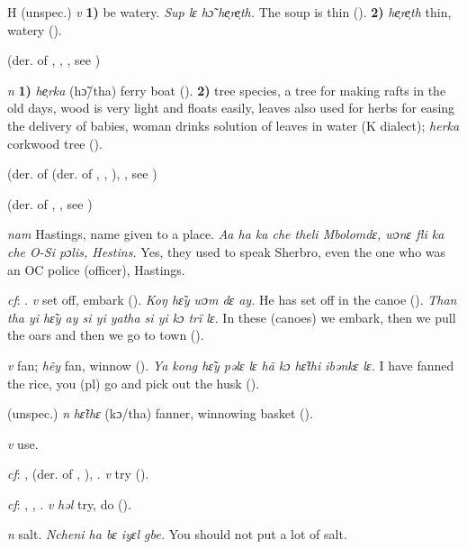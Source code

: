 \begin{letter}{H}
 (unspec.) \textit{v} \textbf{1)} be watery. \textit{Sup lɛ hɔ̃ he̹re̹th.} The soup is thin (\citealt{Pichl1967}). \textbf{2)} \textit{he̹re̹th} thin, watery (\citealt{Pichl1967}). 

 (der. of , , , see ) 

 \textit{n} \textbf{1)} \textit{he̹rka} (hɔ̃/tha) ferry boat (\citealt{Pichl1967}). \textbf{2)} tree species, a tree for making rafts in the old days, wood is very light and floats easily, leaves also used for herbs for easing the delivery of babies, woman drinks solution of leaves in water (K dialect); \textit{herka} corkwood tree (\citealt{Sumner1921}).

 (der. of  (der. of , , ), , see ) 

 (der. of , , see ) 

 \textit{nam} Hastings, name given to a place. \textit{Aa ha ka che theli Mbolomdɛ, wɔnɛ fli ka che O-Si pɔlis, Hestins.} Yes, they used to speak Sherbro, even the one who was an OC police (officer), Hastings.

 \textit{cf}: . \textit{v} set off, embark (\citealt{Sumner1921}). \textit{Koŋ hɛ̃y wɔm dɛ ay.} He has set off in the canoe (\citealt{Pichl1967}). \textit{Than tha yi hɛ̃y ay si yi yatha si yi kɔ trï lɛ.} In these (canoes) we embark, then we pull the oars and then we go to town (\citealt{Pichl1967}).

 \textit{v} fan; \textit{hẽy} fan, winnow (\citealt{Pichl1967}). \textit{Ya kong hɛ̃y pəlɛ lɛ hã kɔ hɛ̃thi ibənkɛ lɛ.} I have fanned the rice, you (pl) go and pick out the husk (\citealt{Pichl1967}).

 (unspec.) \textit{n} \textit{hɛ̃thɛ} (kɔ/tha) fanner, winnowing basket (\citealt{Pichl1967}).

 \textit{v} use.

 \textit{cf}: ,  (der. of , ), . \textit{v} try (\citealt{Sumner1921}).

 \textit{cf}: , , . \textit{v} \textit{həl} try, do (\citealt{Pichl1967}).

 \textit{n} salt. \textit{Ncheni ha bɛ iyɛl gbe.} You should not put a lot of salt.


\end{letter}
